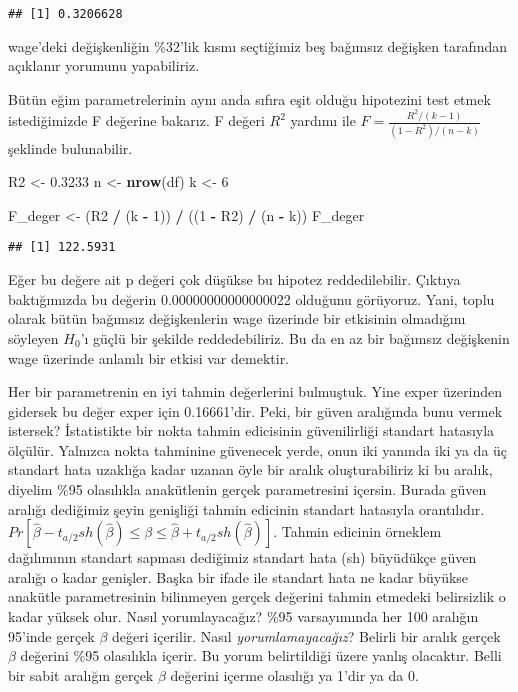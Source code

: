 \documentclass[
]{book}
\newenvironment{Shaded}{\begin{snugshade}}{\end{snugshade}}
\newcommand{\DecValTok}[1]{\textcolor[rgb]{0.00,0.00,0.81}{#1}}
\newcommand{\FloatTok}[1]{\textcolor[rgb]{0.00,0.00,0.81}{#1}}
\newcommand{\KeywordTok}[1]{\textcolor[rgb]{0.13,0.29,0.53}{\textbf{#1}}}
\newcommand{\NormalTok}[1]{#1}
\newcommand{\OperatorTok}[1]{\textcolor[rgb]{0.81,0.36,0.00}{\textbf{#1}}}
\newcommand{\StringTok}[1]{\textcolor[rgb]{0.31,0.60,0.02}{#1}}
\begin{document}
\begin{verbatim}
## [1] 0.3206628
\end{verbatim}

wage'deki değişkenliğin \%32'lik kısmı seçtiğimiz beş bağımsız değişken tarafından açıklanır yorumunu yapabiliriz.

Bütün eğim parametrelerinin aynı anda sıfıra eşit olduğu hipotezini test etmek istediğimizde F değerine bakarız. F değeri \(R^2\) yardımı ile \(F = \frac{R^2/(k-1)}{(1-R^2)/(n-k)}\) şeklinde bulunabilir.

\begin{Shaded}
\begin{Highlighting}[]
\NormalTok{R2 <-}\StringTok{ }\FloatTok{0.3233}
\NormalTok{n <-}\StringTok{ }\KeywordTok{nrow}\NormalTok{(df)}
\NormalTok{k <-}\StringTok{ }\DecValTok{6}

\NormalTok{F_deger <-}\StringTok{ }\NormalTok{(R2 }\OperatorTok{/}\StringTok{ }\NormalTok{(k }\OperatorTok{-}\StringTok{ }\DecValTok{1}\NormalTok{)) }\OperatorTok{/}\StringTok{ }\NormalTok{((}\DecValTok{1} \OperatorTok{-}\StringTok{ }\NormalTok{R2) }\OperatorTok{/}\StringTok{ }\NormalTok{(n }\OperatorTok{-}\StringTok{ }\NormalTok{k))}
\NormalTok{F_deger}
\end{Highlighting}
\end{Shaded}

\begin{verbatim}
## [1] 122.5931
\end{verbatim}

Eğer bu değere ait p değeri çok düşükse bu hipotez reddedilebilir. Çıktıya baktığımızda bu değerin 0.00000000000000022 olduğunu görüyoruz. Yani, toplu olarak bütün bağımsız değişkenlerin wage üzerinde bir etkisinin olmadığını söyleyen \(H_0\)'ı güçlü bir şekilde reddedebiliriz. Bu da en az bir bağımsız değişkenin wage üzerinde anlamlı bir etkisi var demektir.

Her bir parametrenin en iyi tahmin değerlerini bulmuştuk. Yine exper üzerinden gidersek bu değer exper için 0.16661'dir. Peki, bir güven aralığında bunu vermek istersek? İstatistikte bir nokta tahmin edicisinin güvenilirliği standart hatasıyla ölçülür. Yalnızca nokta tahminine güvenecek yerde, onun iki yanında iki ya da üç standart hata uzaklığa kadar uzanan öyle bir aralık oluşturabiliriz ki bu aralık, diyelim \%95 olasılıkla anakütlenin gerçek parametresini içersin. Burada güven aralığı dediğimiz şeyin genişliği tahmin edicinin standart hatasıyla orantılıdır. \(Pr[\hat\beta - t_{a/2}sh(\hat\beta) \le \beta \le \hat\beta + t_{a/2}sh(\hat\beta)]\). Tahmin edicinin örneklem dağılımının standart sapması dediğimiz standart hata (sh) büyüdükçe güven aralığı o kadar genişler. Başka bir ifade ile standart hata ne kadar büyükse anakütle parametresinin bilinmeyen gerçek değerini tahmin etmedeki belirsizlik o kadar yüksek olur. Nasıl yorumlayacağız? \%95 varsayımında her 100 aralığın 95'inde gerçek \(\beta\) değeri içerilir. Nasıl \emph{yorumlamayacağız}? Belirli bir aralık gerçek \(\beta\) değerini \%95 olasılıkla içerir. Bu yorum belirtildiği üzere yanlış olacaktır. Belli bir sabit aralığın gerçek \(\beta\) değerini içerme olasılığı ya 1'dir ya da 0.
\end{document}
